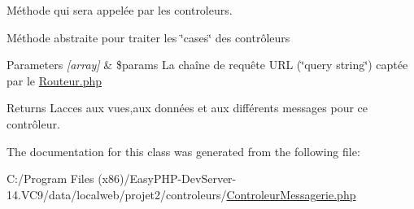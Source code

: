 Méthode qui sera appelée par les controleurs. 

Méthode abstraite pour traiter les \char`\"{}cases\char`\"{} des contrôleurs 
\begin{DoxyParams}{Parameters}
{\em \mbox{[}array\mbox{]}} & \$params La chaîne de requête U\+RL (\char`\"{}query string\char`\"{}) captée par le \hyperlink{_routeur_8php}{Routeur.\+php} \\
\hline
\end{DoxyParams}
\begin{DoxyReturn}{Returns}
L\textquotesingle{}acces aux vues,aux données et aux différents messages pour ce contrôleur. 
\end{DoxyReturn}


The documentation for this class was generated from the following file\+:\begin{DoxyCompactItemize}
\item 
C\+:/\+Program Files (x86)/\+Easy\+P\+H\+P-\/\+Dev\+Server-\/14.\+V\+C9/data/localweb/projet2/controleurs/\hyperlink{_controleur_messagerie_8php}{Controleur\+Messagerie.\+php}\end{DoxyCompactItemize}
